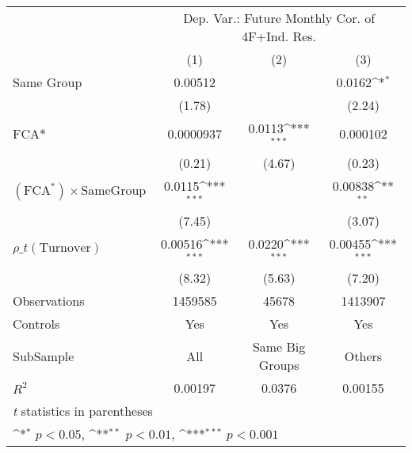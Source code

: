 {
\def\sym#1{\ifmmode^{#1}\else\(^{#1}\)\fi}
\begin{tabular}{l*{3}{c}}
\hline\hline
                &\multicolumn{3}{c}{Dep. Var.: Future Monthly Cor.  of 4F+Ind. Res.}\\\cmidrule(lr){2-4}
                &\multicolumn{1}{c}{(1)}         &\multicolumn{1}{c}{(2)}         &\multicolumn{1}{c}{(3)}         \\
\hline
Same Group      &  0.00512         &                  &   0.0162\sym{*}  \\
                &   (1.78)         &                  &   (2.24)         \\
[1em]
$ \text{FCA*} $ &0.0000937         &   0.0113\sym{***}& 0.000102         \\
                &   (0.21)         &   (4.67)         &   (0.23)         \\
[1em]
 $ (\text{FCA}^*) \times {\text{SameGroup} }  $ &   0.0115\sym{***}&                  &  0.00838\sym{**} \\
                &   (7.45)         &                  &   (3.07)         \\
[1em]
 $ {\rho\_t(\text{Turnover})} $ &  0.00516\sym{***}&   0.0220\sym{***}&  0.00455\sym{***}\\
                &   (8.32)         &   (5.63)         &   (7.20)         \\
\hline
Observations    &  1459585         &    45678         &  1413907         \\
Controls        &      Yes         &      Yes         &      Yes         \\
SubSample       &      All         &Same Big Groups         &   Others         \\
$ R^2$          &  0.00197         &   0.0376         &  0.00155         \\
\hline\hline
\multicolumn{4}{l}{\footnotesize \textit{t} statistics in parentheses}\\
\multicolumn{4}{l}{\footnotesize \sym{*} \(p<0.05\), \sym{**} \(p<0.01\), \sym{***} \(p<0.001\)}\\
\end{tabular}
}
